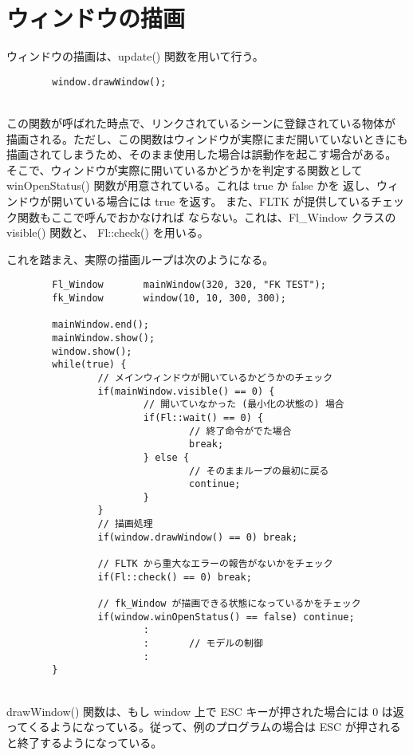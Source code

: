 \section{ウィンドウの描画}
ウィンドウの描画は、update() 関数を用いて行う。
\\
\begin{screen}
\begin{verbatim}
        window.drawWindow();
\end{verbatim}
\end{screen}
~ \\
この関数が呼ばれた時点で、リンクされているシーンに登録されている物体が
描画される。ただし、この関数はウィンドウが実際にまだ開いていないときにも
描画されてしまうため、そのまま使用した場合は誤動作を起こす場合がある。
そこで、ウィンドウが実際に開いているかどうかを判定する関数として
winOpenStatus() 関数が用意されている。これは true か false かを
返し、ウィンドウが開いている場合には true を返す。
また、FLTK が提供しているチェック関数もここで呼んでおかなければ
ならない。これは、Fl\_Window クラスの visible() 関数と、
Fl::check() を用いる。

これを踏まえ、実際の描画ループは次のようになる。
\\
\begin{breakbox}
\begin{verbatim}
        Fl_Window       mainWindow(320, 320, "FK TEST");
        fk_Window       window(10, 10, 300, 300);

        mainWindow.end();
        mainWindow.show();      
        window.show();
        while(true) {
                // メインウィンドウが開いているかどうかのチェック
                if(mainWindow.visible() == 0) {
                        // 開いていなかった (最小化の状態の) 場合
                        if(Fl::wait() == 0) {
                                // 終了命令がでた場合
                                break;
                        } else {
                                // そのままループの最初に戻る
                                continue;
                        }
                }
                // 描画処理
                if(window.drawWindow() == 0) break;

                // FLTK から重大なエラーの報告がないかをチェック
                if(Fl::check() == 0) break;

                // fk_Window が描画できる状態になっているかをチェック
                if(window.winOpenStatus() == false) continue;
                        :
                        :       // モデルの制御
                        :
        }       
\end{verbatim}
\end{breakbox}
~ \\
drawWindow() 関数は、もし window 上で ESC キーが押された場合には
0 は返ってくるようになっている。従って、例のプログラムの場合は
ESC が押されると終了するようになっている。

